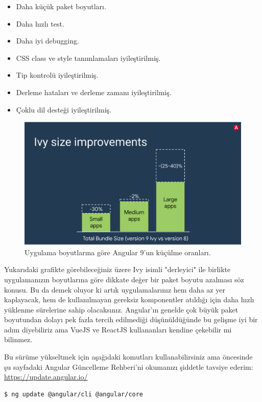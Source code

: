 \documentclass[11pt]{article}
\begin{document}
\begin{itemize}
\item Daha küçük paket boyutları.
\item Daha hızlı test.
\item Daha iyi debugging.
\item CSS class ve style tanımlamaları iyileştirilmiş.
\item Tip kontrolü iyileştirilmiş.
\item Derleme hataları ve derleme zamanı iyileştirilmiş.
\item Çoklu dil desteği iyileştirilmiş.
\end{itemize}

\begin{figure}[htbp]
\centering
\includegraphics[width=.9\linewidth]{gorseller/angular9-paket-boyutlari.png}
\caption{Uygulama boyutlarına göre Angular 9'un küçülme oranları.}
\end{figure}

Yukarıdaki grafikte görebileceğiniz üzere Ivy isimli "derleyici" ile birlikte
uygulamanızın boyutlarına göre dikkate değer bir paket boyutu azalması söz
konusu. Bu da demek oluyor ki artık uygulamalarınız hem daha az yer
kaplayacak, hem de kullanılmayan gereksiz komponentler atıldığı için daha
hızlı yüklenme sürelerine sahip olacaksınız. Angular'ın genelde çok büyük
paket boyutundan dolayı pek fazla tercih edilmediği düşünüldüğünde bu gelişme
iyi bir adım diyebiliriz ama VueJS ve ReactJS kullananları kendine çekebilir
mi bilinmez.

Bu sürüme yükseltmek için aşağıdaki komutları kullanabilirsiniz ama öncesinde
şu sayfadaki Angular Güncelleme Rehberi'ni okumanızı şiddetle tavsiye ederim:
\url{https://update.angular.io/}

\begin{verbatim}
$ ng update @angular/cli @angular/core
\end{verbatim}
\end{document}
